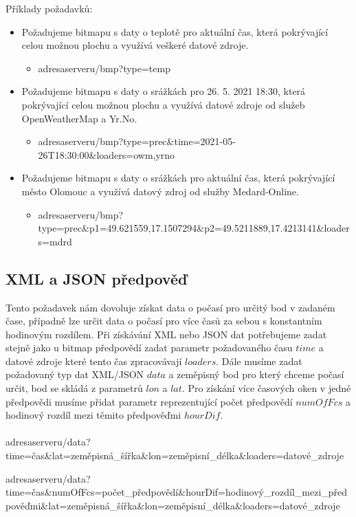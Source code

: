 \documentclass[czech,bachelor,dept460,male,csharp,cpdeclaration]{diploma}
\begin{document}
	Příklady požadavků:
	\begin{itemize}
		\item Požadujeme bitmapu s daty o teplotě pro aktuální čas, která pokrývající celou možnou plochu a využívá veškeré datové zdroje.
		\begin{itemize}
			\item adresaserveru/bmp?type=temp
		\end{itemize}
		\item Požadujeme bitmapu s daty o srážkách pro 26. 5. 2021 18:30, která pokrývající celou možnou plochu a využívá datové zdroje od služeb OpenWeatherMap a Yr.No.
		\begin{itemize}
			\item adresaserveru/bmp?type=prec\&time=2021-05-26T18:30:00\&loaders=owm,yrno
		\end{itemize}
		\item Požadujeme bitmapu s daty o srážkách pro aktuální čas, která pokrývající město Olomouc a využívá datový zdroj od služby Medard-Online.
		\begin{itemize}
			\item adresaserveru/bmp?type=prec\&p1=49.621559,17.1507294\&p2=49.5211889,17.4213141\&loaders=mdrd
		\end{itemize}
	\end{itemize}

	\subsection{XML a JSON předpověď}
	
	Tento požadavek nám dovoluje získat data o počasí pro určitý bod v zadaném čase, případně lze určit data o počasí pro více časů za sebou s konstantním hodinovým rozdílem. Při získávání XML nebo JSON dat potřebujeme zadat stejně jako u bitmap předpovědí zadat parametr požadovaného času $time$ a datové zdroje které tento čas zpracovávají $loaders$. Dále musíme zadat požadovaný typ dat XML/JSON $data$ a zeměpisný bod pro který chceme počasí určit, bod se skládá z parametrů $lon$ a $lat$. Pro získání více časových oken v jedné předpovědi musíme přidat parametr reprezentující počet předpovědí $numOfFcs$ a hodinový rozdíl mezi těmito předpověďmi $hourDif$.
	\\\\
	adresaserveru/{data}?time={čas}\&lat={zeměpisná\_šířka}\&lon={zeměpisní\_délka}\&loaders={datové\_zdroje}
	
	adresaserveru/{data}?time={čas}\&numOfFcs={počet\_předpovědí}\&hourDif={hodinový\_rozdíl\_mezi\_předpověďmi}\&lat={zeměpisná\_šířka}\&lon={zeměpisní\_délka}\&loaders={datové\_zdroje}
	
\end{document}
